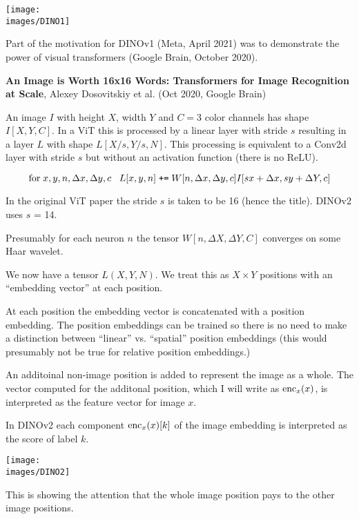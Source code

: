 {{\centerline{\texttt{[image: \\images/DINO1]}}


Part of the motivation for DINOv1 (Meta, April 2021) was to demonstrate the power of visual transformers (Google Brain, October 2020).

\vfill
{\bf An Image is Worth 16x16 Words: Transformers for Image Recognition at Scale}, Alexey Dosovitskiy et al. (Oct 2020, Google Brain)


An image $I$ with height $X$, width $Y$ and $C = 3$ color channels has shape
$I[X,Y,C]$.  In a ViT this is processed by a linear layer with stride $s$ resulting in a layer $L$ with shape $L[X/s,Y/s,N]$.
This processing is equivalent to a Conv2d layer with stride $s$ but
without an activation function (there is no ReLU).

$$\mbox{for}\;x,y,n,\Delta x, \Delta y, c\;\;\;L[x,y,n] \;\mbox{\tt +=}\; W[n,\Delta x,\Delta y,c]I[sx+\Delta x,sy+\Delta Y,c]$$

\vfill
In the original ViT paper the stride $s$ is taken to be 16 (hence the title). DINOv2 uses $s$ = 14.

\vfill
Presumably for each neuron $n$ the tensor $W[n,\Delta X,\Delta Y,C]$ converges on some Haar wavelet.


We now have a tensor $L(X,Y,N)$. We treat this as $X \times Y$ positions with an ``embedding vector'' at each position.

\vfill
At each position the embedding vector is concatenated with a position embedding. The position embeddings can be trained so there is no need
to make a distinction between ``linear'' vs. ``spatial'' position embeddings (this would presumably not be true for relative position embeddings.)

\vfill
An additoinal non-image  position is added to represent the image as a whole. The vector computed for the additonal position, which I will write as $\mathrm{enc}_x(x)$, is interpreted as the feature vector
for image $x$.

\vfill
In DINOv2 each component $\mathrm{enc}_x(x)[k]$ of the image embedding is interpreted as the score of label $k$.


\centerline{\texttt{[image: \\images/DINO2]}}

\vfill
This is showing the attention that the whole image position pays to the other image positions.

}}
